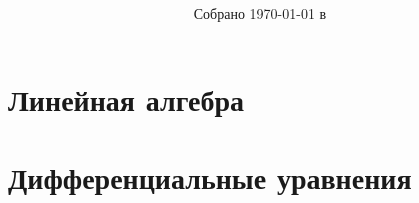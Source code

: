 \documentclass[a4paper]{article}
\title{\huge \textbf{\papertitle}}
\author{\paperauthors}
\date{Собрано {\ddmmyyyydate\today} в \currenttime}
\begin{document}
  
  

  \section{Линейная алгебра}
  
  
  
  
  
  
  
  
  
  
  
  
  
  

  \section{Дифференциальные уравнения}
  
  
  
  
  
  
  
  
  
  
  
  
  
  
  
  
  
  
  
  
\end{document}
